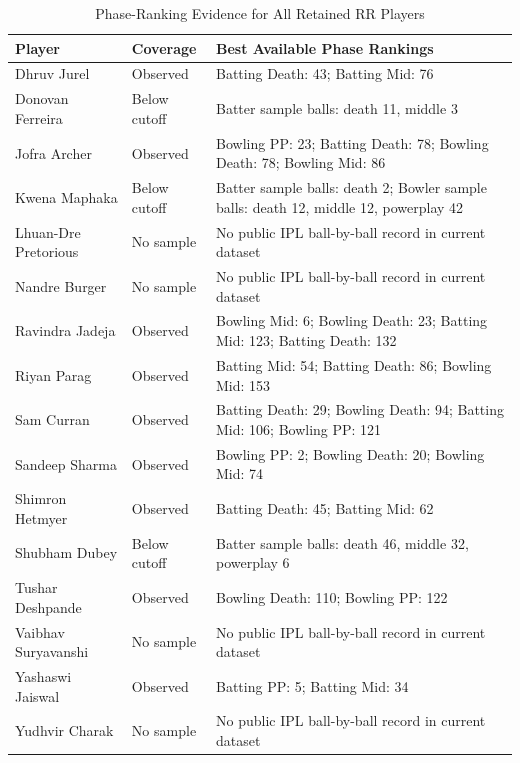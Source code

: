 \begin{table}[H]
\centering
\caption{Phase-Ranking Evidence for All Retained RR Players}
\begin{tabular}{p{3.1cm}p{1.6cm}p{8.2cm}}
\toprule
Player & Coverage & Best Available Phase Rankings \\
\midrule
Dhruv Jurel & Observed & Batting Death: 43; Batting Mid: 76 \\
Donovan Ferreira & Below cutoff & Batter sample balls: death 11, middle 3 \\
Jofra Archer & Observed & Bowling PP: 23; Batting Death: 78; Bowling Death: 78; Bowling Mid: 86 \\
Kwena Maphaka & Below cutoff & Batter sample balls: death 2; Bowler sample balls: death 12, middle 12, powerplay 42 \\
Lhuan-Dre Pretorious & No sample & No public IPL ball-by-ball record in current dataset \\
Nandre Burger & No sample & No public IPL ball-by-ball record in current dataset \\
Ravindra Jadeja & Observed & Bowling Mid: 6; Bowling Death: 23; Batting Mid: 123; Batting Death: 132 \\
Riyan Parag & Observed & Batting Mid: 54; Batting Death: 86; Bowling Mid: 153 \\
Sam Curran & Observed & Batting Death: 29; Bowling Death: 94; Batting Mid: 106; Bowling PP: 121 \\
Sandeep Sharma & Observed & Bowling PP: 2; Bowling Death: 20; Bowling Mid: 74 \\
Shimron Hetmyer & Observed & Batting Death: 45; Batting Mid: 62 \\
Shubham Dubey & Below cutoff & Batter sample balls: death 46, middle 32, powerplay 6 \\
Tushar Deshpande & Observed & Bowling Death: 110; Bowling PP: 122 \\
Vaibhav Suryavanshi & No sample & No public IPL ball-by-ball record in current dataset \\
Yashaswi Jaiswal & Observed & Batting PP: 5; Batting Mid: 34 \\
Yudhvir Charak & No sample & No public IPL ball-by-ball record in current dataset \\
\bottomrule
\end{tabular}
\end{table}
